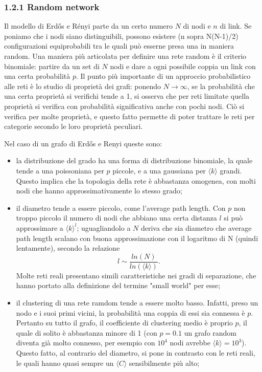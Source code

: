 \subsubsection{1.2.1 Random network}
Il modello di Erdős e Rényi parte da un certo numero $N$ di nodi e $n$ di link. Se poniamo che i nodi siano distinguibili, possono esistere (n sopra N(N-1)/2) 
configurazioni equiprobabili tra le quali può esserne presa una in maniera random. Una maniera più articolata per definire una rete random è il criterio binomiale: partire da un set di $N$ nodi e dare a ogni possibile coppia un link con una certa probabilità  $p$. 
Il punto più importante di un approccio probabilistico alle reti è lo studio di proprietà dei grafi: ponendo $N \rightarrow \infty$, se la probabilità che una certa proprietà si verifichi tende a 1, si osserva che per reti limitate quella proprietà si verifica con probabilità significativa anche con pochi nodi. Ciò si verifica per molte proprietà, e questo fatto permette di poter trattare le reti per categorie secondo le loro proprietà peculiari.

Nel caso di un grafo di Erdős e Renyi queste sono:

\begin{itemize}
	\item la distribuzione del grado ha una forma di distribuzione binomiale, la quale tende a una poissoniana per $p$ piccole, e a una gaussiana per $\langle k \rangle$ grandi. Questo implica che la topologia della rete è abbastanza omogenea, con molti nodi che hanno approssimativamente lo stesso grado;
	
	\item il diametro tende a essere piccolo, come l'average path length. Con $p$ non troppo piccolo il numero di nodi che abbiano una certa distanza $l$ si può approssimare a $\langle k\rangle^l$; uguagliandolo a $N$ deriva che sia diametro che average path length scalano con buona approssimazione con il logaritmo di N (quindi lentamente), secondo la relazione
	\begin{equation}
	\label{eq:lunghezze}
	l \sim \frac{ln(N)}{ln(\langle k \rangle)}. 	 
	\end{equation}
	Molte reti reali presentano simili caratteristiche nei gradi di separazione, che hanno portato alla definizione del termine "small world" per esse;
	
	\item il clustering di una rete ramdom tende a essere molto basso. Infatti, preso un nodo e i suoi primi vicini, la probabilità una coppia di essi sia connessa è $p$. Pertanto su tutto il grafo, il coefficiente di clustering medio è proprio $p$, il quale di solito è abbastanza minore di 1 (con $p = 0.1$ un grafo random diventa già molto connesso, per esempio con $10^4$ nodi avrebbe $\langle k\rangle = 10^3$). Questo fatto, al contrario del diametro, si pone in contrasto con le reti reali, le quali hanno quasi sempre un $\langle C \rangle$ sensibilmente più alto;
\end{itemize}

